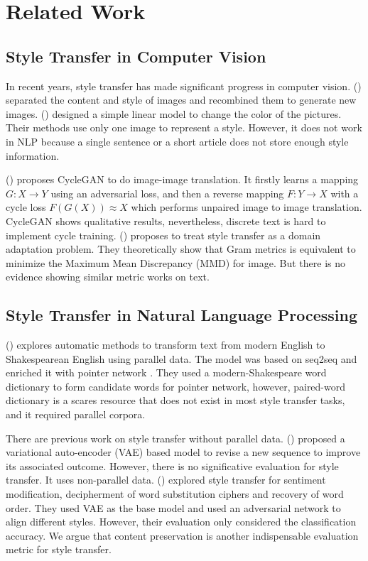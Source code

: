 \documentclass[letterpaper]{article} \usepackage{aaai18}  \usepackage{times}  \usepackage{helvet}  \usepackage{courier}  \usepackage{url}  \usepackage{graphicx}  \usepackage{amsmath}
\newcommand{\newcite}[1]{\citeauthor{#1} (\citeyear{#1})}
\begin{document}
\noindent
\section{Related Work}

\subsection{Style Transfer in Computer Vision}
In recent years, style transfer has made significant progress in computer vision. 
\newcite{gatys2016image} separated the content and style of images and recombined them to generate new images. 
\newcite{gatys2016preserving} designed a simple linear model to change the color of the pictures.
Their methods use only one image to represent a style.
However, it does not work in NLP because a single sentence or a short article does not store enough style information.

\newcite{zhu2017unpaired} proposes CycleGAN to do image-image translation. 
It firstly learns a mapping $G: X \to Y$ using an adversarial loss, 
and then a reverse mapping $ F: Y \to X$ with a cycle loss $F(G(X)) \approx X$ which performs unpaired image to image translation. 
CycleGAN shows qualitative results, nevertheless, discrete text is hard to implement cycle training. 
\newcite{li2017demystifying} proposes  
to treat style transfer as a domain adaptation problem. 
They theoretically show that Gram metrics is equivalent to minimize the Maximum Mean Discrepancy (MMD) for image. 
But there is no evidence showing similar metric works on text. 


\subsection{Style Transfer in Natural Language Processing}
\newcite{jhamtani2017shakespearizing} explores automatic methods to transform text from modern English to 
Shakespearean English using parallel data. The model was based on seq2seq and enriched it with pointer network \cite{vinyals2015pointer}.
They used a modern-Shakespeare word dictionary to form candidate words for pointer network, 
however, paired-word dictionary is a scares resource that does not exist in most style transfer tasks,
and it required parallel corpora.


There are previous work on style transfer without parallel data. 
\newcite{mueller2017sequence} proposed a variational auto-encoder (VAE) based model 
to revise a new sequence to improve its associated outcome.
However, there is no significative evaluation for style transfer.
It uses non-parallel data.
\newcite{shen2017style} explored style transfer for sentiment modification,
decipherment of word substitution ciphers and recovery of word order. 
They used VAE as the base model and used an adversarial network to align different styles. 
However, their evaluation only considered the classification accuracy.  
We argue that content preservation is another indispensable evaluation metric for style transfer. 
\end{document}

